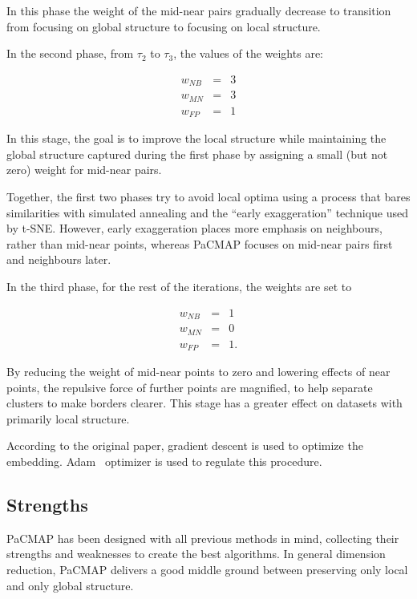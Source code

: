 In this phase the weight of the mid-near pairs gradually decrease to transition from focusing on global structure to focusing on local structure.

In the second phase, from $\tau_2$ to $\tau_3$, the values of the weights are:

\begin{equation}
	\begin{aligned}
		w_{NB} & = & 3 \\
		w_{MN} & = & 3 \\
		w_{FP} & = & 1
	\end{aligned}
\end{equation}

In this stage, the goal is to improve the local structure while maintaining the global structure captured during the first phase by assigning a small (but not zero) weight for mid-near pairs.

Together, the first two phases try to avoid local optima using a process that bares similarities with simulated annealing and the ``early exaggeration'' technique used by t-SNE. However, early exaggeration places more emphasis on neighbours, rather than mid-near points, whereas PaCMAP focuses on mid-near pairs first and neighbours later.

In the third phase, for the rest of the iterations, the weights are set to

\begin{equation}
	\begin{aligned}
		w_{NB} & = & 1 \\
		w_{MN} & = & 0 \\
		w_{FP} & = & 1.
	\end{aligned}
\end{equation}

By reducing the weight of mid-near points to zero and lowering effects of near points, the repulsive force of further points are magnified, to help separate clusters to make borders clearer. This stage has a greater effect on datasets with primarily local structure. 

According to the original paper, gradient descent is used to optimize the embedding. Adam~\cite{bib:adam} optimizer is used to regulate this procedure.

\subsection{Strengths}

PaCMAP has been designed with all previous methods in mind, collecting their strengths and weaknesses to create the best algorithms. In general dimension reduction, PaCMAP delivers a good middle ground between preserving only local and only global structure. 

